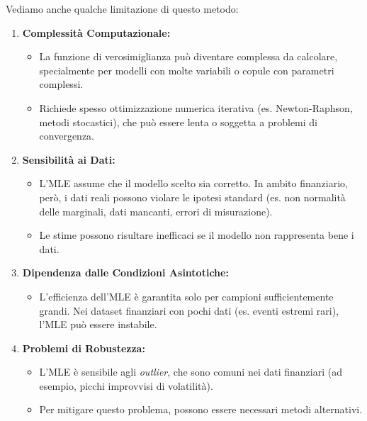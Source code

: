 \documentclass[a4paper,12pt]{article}
\begin{document}
\begin{itemize}
	Vediamo anche qualche limitazione di questo metodo:
	\begin{enumerate}[label=\arabic*.]
		\item \textbf{Complessità Computazionale:}
		\begin{itemize}
			\item La funzione di verosimiglianza può diventare complessa da calcolare, specialmente per modelli con molte variabili o copule con parametri complessi.
			\item Richiede spesso ottimizzazione numerica iterativa (es. Newton-Raphson, metodi stocastici), che può essere lenta o soggetta a problemi di convergenza.
		\end{itemize}
		
		\item \textbf{Sensibilità ai Dati:}
		\begin{itemize}
			\item L'MLE assume che il modello scelto sia corretto. In ambito finanziario, però, i dati reali possono violare le ipotesi standard (es. non normalità delle marginali, dati mancanti, errori di misurazione).
			\item Le stime possono risultare inefficaci se il modello non rappresenta bene i dati.
		\end{itemize}
		
		\item \textbf{Dipendenza dalle Condizioni Asintotiche:}
		\begin{itemize}
			\item L'efficienza dell'MLE è garantita solo per campioni sufficientemente grandi. Nei dataset finanziari con pochi dati (es. eventi estremi rari), l'MLE può essere instabile.
		\end{itemize}
		
		\item \textbf{Problemi di Robustezza:}
		\begin{itemize}
			\item L'MLE è sensibile agli \textit{outlier}, che sono comuni nei dati finanziari (ad esempio, picchi improvvisi di volatilità).
			\item Per mitigare questo problema, possono essere necessari metodi alternativi.
		\end{itemize}
		

\end{enumerate}
\end{itemize}
\end{document}

